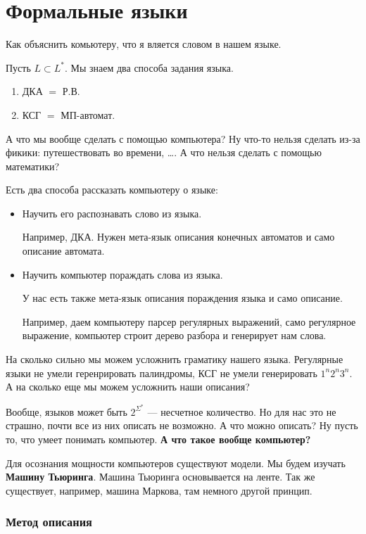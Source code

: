 \section{Формальные языки}

Как объяснить комьютеру, что я вляется словом в нашем языке.

Пусть $L \subset L^{*}$.
Мы знаем два способа задания языка. \begin{enumerate}
    \item ДКА $=$ Р.В.
    \item КСГ $=$ МП-автомат.
\end{enumerate}

А что мы вообще сделать с помощью компьютера? Ну что-то нельзя сделать из-за фикики: путешествовать во времени, \ldots.
А что нельзя сделать с помощью математики?

Есть два способа рассказать компьютеру о языке: \begin{itemize}
    \item Научить его распознавать слово из языка.

    Например, ДКА. Нужен мета-язык описания конечных автоматов и само описание автомата.

    \item Научить компьютер пораждать слова из языка.

    У нас есть также мета-язык описания пораждения языка и само описание.

    Например, даем компьютеру парсер регулярных выражений, само регулярное выражение, компьютер строит дерево разбора и генерирует нам слова.
\end{itemize}

На сколько сильно мы можем усложнить граматику нашего языка.
Регулярные языки не умели геренрировать палиндромы, КСГ не умели генерировать $1^n 2^n 3^n$. А на сколько еще мы можем усложнить наши описания?

Вообще, языков может быть $2^{\Sigma ^{*}}$ --- несчетное количество. Но для нас это не страшно, почти все из них описать не возможно.
А что можно описать? Ну пусть то, что умеет понимать компьютер.
\textbf{ А что такое вообще компьютер? }

Для осознания мощности компьютеров существуют модели. Мы будем изучать \textbf{Машину Тьюринга}. Машина Тьюринга основывается на ленте. Так же существует, например, машина Маркова, там немного другой принцип.

\subsubsection*{Метод описания}

